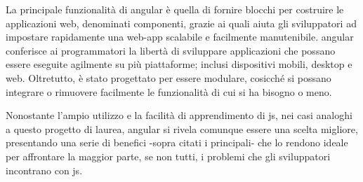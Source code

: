 
%

La principale funzionalità di \gls{angular} è quella di fornire blocchi per costruire le applicazioni web, denominati componenti, grazie ai quali aiuta gli sviluppatori ad impostare rapidamente una web-app scalabile e facilmente manutenibile. 
\gls{angular} conferisce ai programmatori la libertà di sviluppare applicazioni che possano essere eseguite agilmente su più piattaforme; inclusi dispositivi mobili, desktop e web. Oltretutto, è stato progettato per essere modulare, cosicché si possano integrare o rimuovere facilmente le funzionalità di cui si ha bisogno o meno.

Nonostante l'ampio utilizzo e la facilità di apprendimento di \acrlong{js}, nei casi analoghi a questo progetto di laurea, \gls{angular} si rivela comunque essere una scelta migliore, presentando una serie di benefici -sopra citati i principali- che lo rendono ideale per affrontare la maggior parte, se non tutti, i problemi che gli sviluppatori incontrano con \acrlong{js}. 

